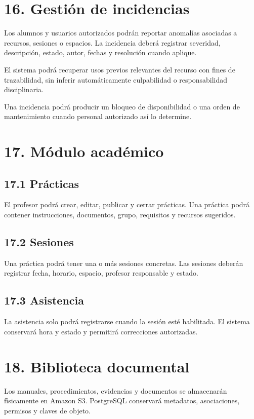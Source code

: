 \documentclass[12pt]{article}
\begin{document}
\section*{16. Gestión de incidencias}

Los alumnos y usuarios autorizados podrán reportar anomalías asociadas a recursos, sesiones o espacios. La incidencia deberá registrar severidad, descripción, estado, autor, fechas y resolución cuando aplique.

El sistema podrá recuperar usos previos relevantes del recurso con fines de trazabilidad, sin inferir automáticamente culpabilidad o responsabilidad disciplinaria.

Una incidencia podrá producir un bloqueo de disponibilidad o una orden de mantenimiento cuando personal autorizado así lo determine.

\section*{17. Módulo académico}

\subsection*{17.1 Prácticas}

El profesor podrá crear, editar, publicar y cerrar prácticas. Una práctica podrá contener instrucciones, documentos, grupo, requisitos y recursos sugeridos.

\subsection*{17.2 Sesiones}

Una práctica podrá tener una o más sesiones concretas. Las sesiones deberán registrar fecha, horario, espacio, profesor responsable y estado.

\subsection*{17.3 Asistencia}

La asistencia solo podrá registrarse cuando la sesión esté habilitada. El sistema conservará hora y estado y permitirá correcciones autorizadas.

\section*{18. Biblioteca documental}

Los manuales, procedimientos, evidencias y documentos se almacenarán físicamente en Amazon S3. PostgreSQL conservará metadatos, asociaciones, permisos y claves de objeto.
\end{document}
